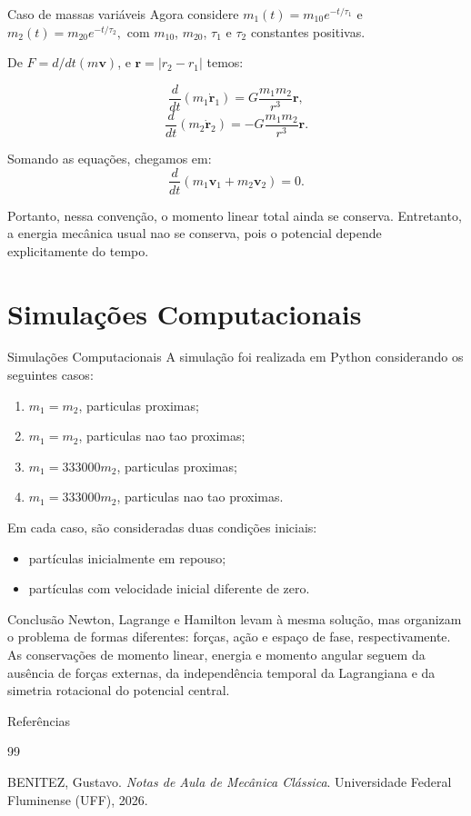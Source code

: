 \documentclass[10pt]{beamer}
\begin{document}
\begin{frame}{Caso de massas variáveis}
    Agora considere
$m_1(t)=m_{10}e^{-t/\tau_1}$ e
$m_2(t)=m_{20}e^{-t/\tau_2},$
com $m_{10}$, $m_{20}$, $\tau_1$ e $\tau_2$ constantes positivas.

De $F=d/dt(m\bm v)$, e $\bm r = |r_2 - r_1|$ temos:

\begin{equation}
\frac{d}{dt}(m_1\dot{\bm r}_1)
=G\frac{m_1m_2}{r^3}\bm r,
\end{equation}
\begin{equation}
\frac{d}{dt}(m_2\dot{\bm r}_2)
=-G\frac{m_1m_2}{r^3}\bm r.
\end{equation}

Somando as equações, chegamos em:
\begin{equation}
\frac{d}{dt}
(m_1\bm v_1+m_2\bm v_2)=0.
\end{equation}

Portanto, nessa convenção, o momento linear total ainda se conserva. Entretanto, a
energia mecânica usual nao se conserva, pois o potencial depende explicitamente do tempo.
\end{frame}
\section{Simulações Computacionais}
\begin{frame}{Simulações Computacionais}
    A simulação foi realizada em Python considerando os seguintes casos:
    
\begin{enumerate}
    \item $m_1=m_2$, particulas proximas;
    \item $m_1=m_2$, particulas nao tao proximas;
    \item $m_1=333000m_2$, particulas proximas;
    \item $m_1=333000m_2$, particulas nao tao proximas.
\end{enumerate}

Em cada caso, são consideradas duas condições iniciais:
\begin{itemize}
    \item partículas inicialmente em repouso;
    \item partículas com velocidade inicial diferente de zero.
\end{itemize}
\end{frame}

\begin{frame}{Conclusão}
    Newton, Lagrange e Hamilton levam à mesma solução, mas organizam o problema de
formas diferentes: forças, ação e espaço de fase, respectivamente. As conservações de
momento linear, energia e momento angular seguem da ausência de forças externas, da
independência temporal da Lagrangiana e da simetria rotacional do potencial central.
\end{frame}

\begin{frame}{Referências}
 \begin{thebibliography}{99}

\bibitem{}
BENITEZ, Gustavo.
\textit{Notas de Aula de Mecânica Clássica}.
Universidade Federal Fluminense (UFF), 2026.

\end{thebibliography}
\end{frame}
\end{document}
